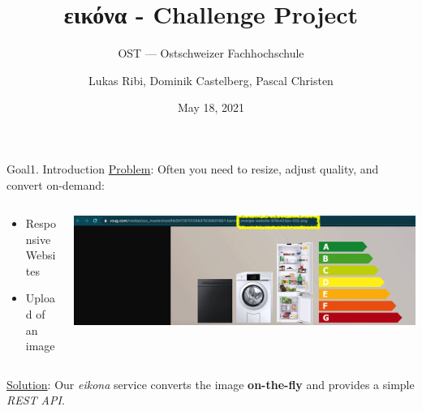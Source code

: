 \documentclass[aspectratio=169,20pt]{beamer}
\title{εικόνα - Challenge Project}
\subtitle{OST — Ostschweizer Fachhochschule}
\date{May 18, 2021}
\author{Lukas Ribi, Dominik Castelberg, Pascal Christen}
\institute{DS1 - Thomas Bocek }
\begin{document}
\begin{frame}
	\titlepage
\end{frame}

\begin{frame}{Goal}{1. Introduction}
	\underline{Problem}: Often you need to resize, adjust quality, and convert on-demand:
	\vspace{1in}
	\begin{columns}[onlytextwidth,T]
		\begin{column}{.25\linewidth}
			\begin{itemize}
				\item{Responsive Websites}
				\item{Upload of an image}
			\end{itemize}
		\end{column}
		\begin{column}{.65\linewidth}
			\includegraphics[scale=0.55]{vzug}
		\end{column}
	\end{columns}
	\underline{Solution}: Our \textit{eikona} service converts the image \textbf{on-the-fly} and provides a simple \textit{REST API}.
\end{frame}
\end{document}
